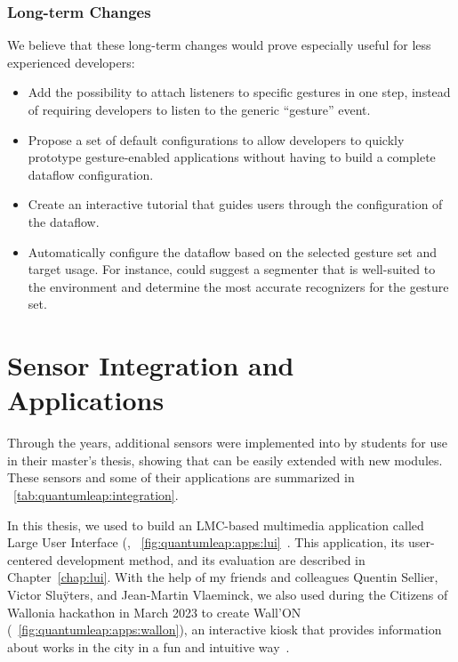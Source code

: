 \subsubsection{Long-term Changes} 
We believe that these long-term changes would prove especially useful for less experienced developers:
\begin{itemize}
    \item Add the possibility to attach listeners to specific gestures in one step, instead of requiring developers to listen to the generic ``gesture'' event.
    \item Propose a set of default configurations to allow developers to quickly prototype gesture-enabled applications without having to build a complete dataflow configuration.
    \item Create an interactive tutorial that guides users through the configuration of the \ql dataflow.
    \item Automatically configure the dataflow based on the selected gesture set and target usage. For instance, \ql could suggest a segmenter that is well-suited to the environment and determine the most accurate recognizers for the gesture set.
\end{itemize}


\section{Sensor Integration and Applications} \label{sec:quantumleap:integration}
Through the years, additional sensors were implemented into \ql by students for use in their master's thesis, showing that \ql can be easily extended with new modules. These sensors and some of their applications are summarized in \tab~\ref{tab:quantumleap:integration}.

In this thesis, we used \ql to build an LMC-based multimedia application called Large User Interface (\lui, \fig~\ref{fig:quantumleap:apps:lui}~\cite{Sluyters:2022:LUI}. This application, its user-centered development method, and its evaluation are described in Chapter~\ref{chap:lui}.
%
With the help of my friends and colleagues Quentin Sellier, Victor Slu\"{y}ters, and Jean-Martin Vlaeminck, we also used \ql during the Citizens of Wallonia hackathon in March 2023 to create Wall'ON (\fig~\ref{fig:quantumleap:apps:wallon}), an interactive kiosk that provides information about works in the city in a fun and intuitive way~\cite{Rawart:2023}.

